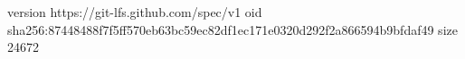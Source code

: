version https://git-lfs.github.com/spec/v1
oid sha256:87448488f7f5ff570eb63bc59ec82df1ec171e0320d292f2a866594b9bfdaf49
size 24672
